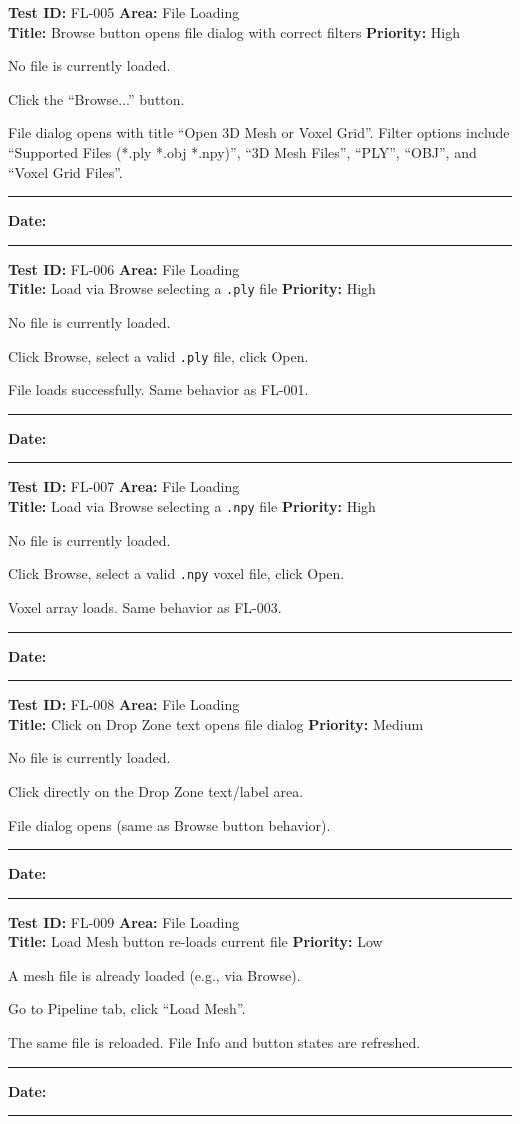 \documentclass[12pt,a4paper]{article}
\newenvironment{testcase}[4]{%
  \smallskip
  \noindent\textbf{Test ID:} #1 \hfill \textbf{Area:} #2 \\
  \textbf{Title:} #3 \hfill \textbf{Priority:} #4
  \begin{description}[leftmargin=2em,style=nextline]
    \item[\textbf{Preconditions:}]
}{%
    \item[\textbf{Steps:}]
    \item[\textbf{Expected Result:}]
    \item[\textbf{Status:}] \rule{3cm}{0.4pt} \hspace{1em} \textbf{Date:} \rule{3cm}{0.4pt}
    \item[\textbf{Notes:}]
  \end{description}
  \smallskip
}
\begin{document}
\begin{testcase}{FL-005}{File Loading}{Browse button opens file dialog with correct filters}{High}
  \item No file is currently loaded.
  \item Click the ``Browse...'' button.
  \item File dialog opens with title ``Open 3D Mesh or Voxel Grid''. Filter options include ``Supported Files (*.ply *.obj *.npy)'', ``3D Mesh Files'', ``PLY'', ``OBJ'', and ``Voxel Grid Files''.
\end{testcase}

\begin{testcase}{FL-006}{File Loading}{Load via Browse selecting a \texttt{.ply} file}{High}
  \item No file is currently loaded.
  \item Click Browse, select a valid \texttt{.ply} file, click Open.
  \item File loads successfully. Same behavior as FL-001.
\end{testcase}

\begin{testcase}{FL-007}{File Loading}{Load via Browse selecting a \texttt{.npy} file}{High}
  \item No file is currently loaded.
  \item Click Browse, select a valid \texttt{.npy} voxel file, click Open.
  \item Voxel array loads. Same behavior as FL-003.
\end{testcase}

\begin{testcase}{FL-008}{File Loading}{Click on Drop Zone text opens file dialog}{Medium}
  \item No file is currently loaded.
  \item Click directly on the Drop Zone text/label area.
  \item File dialog opens (same as Browse button behavior).
\end{testcase}

\begin{testcase}{FL-009}{File Loading}{Load Mesh button re-loads current file}{Low}
  \item A mesh file is already loaded (e.g., via Browse).
  \item Go to Pipeline tab, click ``Load Mesh''.
  \item The same file is reloaded. File Info and button states are refreshed.
\end{testcase}
\end{document}
